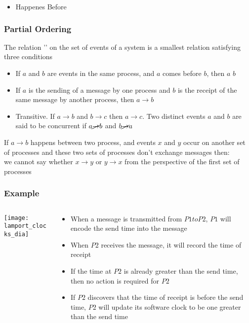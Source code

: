 \documentclass[aspectratio=169, 15pt,usenames,dvipsnames]{beamer}
\begin{document}
{\begin{gdblank}
\begin{itemize}
			\item Happenes Before
		\end{itemize}		
	\end{gdblank}
	\begin{gdblank}
		\frametitle{Partial Ordering}
		The relation '\rightarrow' on the set of events of a system is a smallest relation satisfying three conditions
		\begin{itemize}
			\item If $a$ and $b$ are events in the same process, and $a$ comes before $b$, then $a$ \rightarrow $b$ 
			\item If $a$ is the sending of a message by one process and $b$ is the receipt of the same message by another process, then $a\rightarrow b$
			\item Transitive. If $a\rightarrow b$ and $b\rightarrow c$ then $a\rightarrow c$. Two distinct events $a$ and $b$ are said to be concurrent if $a\cancel{\rightarrow} b$ and $b\cancel{\rightarrow} a$
		\end{itemize}				
		\par
		If $a\rightarrow b$ happens between two process, and events $x$ and $y$ occur on another set of processes and these two sets of processes don’t exchange messages then:\\
		we cannot say whether $x\rightarrow y$ or $y\rightarrow x$ from the perspective of the first set of processes
	\end{gdblank}
	\begin{gdblank}
		\frametitle{Example}
		\begin{columns}
			\begin{column}{0.5\textwidth}
				\texttt{[image: lamport\_clocks\_dia]}			
			\end{column}
			\begin{column}{0.5\textwidth}
				\begin{itemize}
					\item When a message is transmitted from $P1 to P2$, $P1$ will encode the send time into the message
					      \pause
					\item When $P2$ receives the message, it will record the time of receipt
					      \pause
					\item If the time at $P2$ is already greater than the send time, then no action is required for $P2$
					      \pause
					\item If $P2$ discovers that the time of receipt is before the send time, $P2$ will update its software clock to be one greater than the send time

\end{itemize}
\end{column}
\end{columns}
\end{gdblank}}
\end{document}
